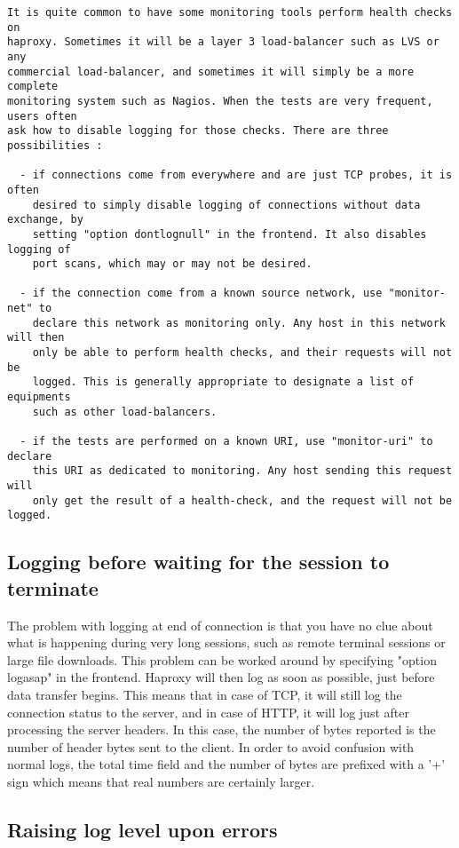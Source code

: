 \begin{verbatim}
It is quite common to have some monitoring tools perform health checks on
haproxy. Sometimes it will be a layer 3 load-balancer such as LVS or any
commercial load-balancer, and sometimes it will simply be a more complete
monitoring system such as Nagios. When the tests are very frequent, users often
ask how to disable logging for those checks. There are three possibilities :

  - if connections come from everywhere and are just TCP probes, it is often
    desired to simply disable logging of connections without data exchange, by
    setting "option dontlognull" in the frontend. It also disables logging of
    port scans, which may or may not be desired.

  - if the connection come from a known source network, use "monitor-net" to
    declare this network as monitoring only. Any host in this network will then
    only be able to perform health checks, and their requests will not be
    logged. This is generally appropriate to designate a list of equipments
    such as other load-balancers.

  - if the tests are performed on a known URI, use "monitor-uri" to declare
    this URI as dedicated to monitoring. Any host sending this request will
    only get the result of a health-check, and the request will not be logged.
\end{verbatim}

\subsection{Logging before waiting for the session to terminate}

The problem with logging at end of connection is that you have no clue about
what is happening during very long sessions, such as remote terminal sessions
or large file downloads. This problem can be worked around by specifying
"option logasap" in the frontend. Haproxy will then log as soon as possible,
just before data transfer begins. This means that in case of TCP, it will still
log the connection status to the server, and in case of HTTP, it will log just
after processing the server headers. In this case, the number of bytes reported
is the number of header bytes sent to the client. In order to avoid confusion
with normal logs, the total time field and the number of bytes are prefixed
with a '+' sign which means that real numbers are certainly larger.


\subsection{Raising log level upon errors}


